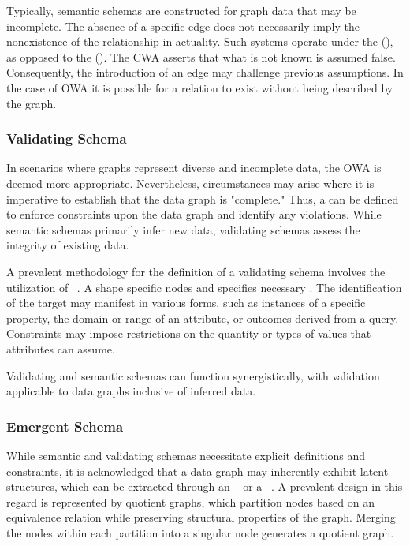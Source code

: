 Typically, semantic schemas are constructed for graph data that may be incomplete. The absence of a specific edge does not necessarily imply the nonexistence of the relationship in actuality. Such systems operate under the  (), as opposed to the  (). The CWA asserts that what is not known is assumed false. Consequently, the introduction of an edge may challenge previous assumptions. In the case of OWA it is possible for a relation to exist without being described by the graph.



\subsubsection{Validating Schema}
In scenarios where graphs represent diverse and incomplete data, the OWA is deemed more appropriate. Nevertheless, circumstances may arise where it is imperative to establish that the data graph is "complete." Thus, a  can be defined to enforce constraints upon the data graph and identify any violations. While semantic schemas primarily infer new data, validating schemas assess the integrity of existing data.

A prevalent methodology for the definition of a validating schema involves the utilization of ~\cite{Knublauch2017SHACL, LabraGayo2017ValidatingRDF, Prudhommeaux2014ShapeExpressions}. A shape  specific nodes and specifies necessary . The identification of the target may manifest in various forms, such as instances of a specific property, the domain or range of an attribute, or outcomes derived from a query. Constraints may impose restrictions on the quantity or types of values that attributes can assume. 

Validating and semantic schemas can function synergistically, with validation applicable to data graphs inclusive of inferred data.

\subsubsection{Emergent Schema}
While semantic and validating schemas necessitate explicit definitions and constraints, it is acknowledged that a data graph may inherently exhibit latent structures, which can be extracted through an ~\cite{Pham2015EmergenSchemaFromRDF} or a ~\cite{Cebiric2019SummarizingSemanticGraphs, Liu2018GraphuSummarizationMethodsAndApplications, Spahiu2016ABSTAT}. A prevalent design in this regard is represented by quotient graphs, which partition nodes based on an equivalence relation while preserving structural properties of the graph. Merging the nodes within each partition into a singular node generates a quotient graph.

